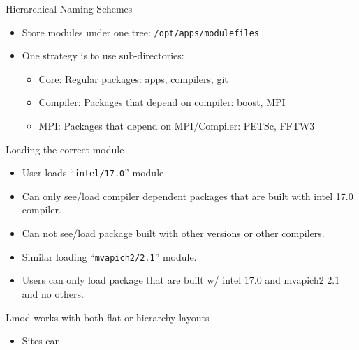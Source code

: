 \documentclass{beamer}
\begin{document}
\begin{frame}{Hierarchical Naming Schemes}
  \begin{itemize}
    \item Store modules under one tree: \texttt{/opt/apps/modulefiles}
    \item One strategy is to use sub-directories:
      \begin{itemize}
        \item Core: Regular packages: apps, compilers, git
        \item Compiler: Packages that depend on compiler: boost, MPI
        \item MPI: Packages that depend on MPI/Compiler: PETSc, FFTW3
      \end{itemize}
  \end{itemize}
\end{frame}

\begin{frame}{Loading the correct module}
  \begin{itemize}
    \item User loads ``\texttt{intel/17.0}'' module
    \item Can only see/load compiler dependent packages that are built with
      intel 17.0 compiler.
    \item Can not see/load package built with other versions or other compilers.
    \item Similar loading ``\texttt{mvapich2/2.1}'' module.
    \item Users can only load package that are built w/ intel 17.0 and
      mvapich2 2.1 and no others.
  \end{itemize}
\end{frame}

\begin{frame}{Lmod works with both flat or hierarchy layouts}
  \begin{itemize}
    \item Sites can 
  \end{itemize}
\end{frame}





\end{document}
